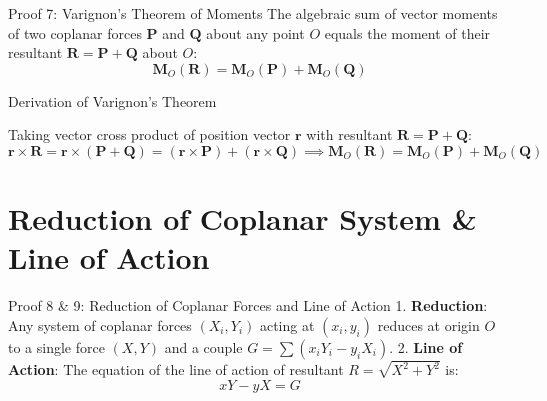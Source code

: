 \documentclass[11pt, a4paper]{report}
\begin{document}
\begin{theorembox}{Proof 7: Varignon's Theorem of Moments}
The algebraic sum of vector moments of two coplanar forces $\mathbf{P}$ and $\mathbf{Q}$ about any point $O$ equals the moment of their resultant $\mathbf{R} = \mathbf{P} + \mathbf{Q}$ about $O$:
\begin{equation}
\mathbf{M}_O(\mathbf{R}) = \mathbf{M}_O(\mathbf{P}) + \mathbf{M}_O(\mathbf{Q})
\end{equation}
\end{theorembox}

\begin{proofbox}{Derivation of Varignon's Theorem}
\begin{center}
\end{center}

Taking vector cross product of position vector $\mathbf{r}$ with resultant $\mathbf{R} = \mathbf{P} + \mathbf{Q}$:
\[
\mathbf{r} \times \mathbf{R} = \mathbf{r} \times (\mathbf{P} + \mathbf{Q}) = (\mathbf{r} \times \mathbf{P}) + (\mathbf{r} \times \mathbf{Q}) \implies \mathbf{M}_O(\mathbf{R}) = \mathbf{M}_O(\mathbf{P}) + \mathbf{M}_O(\mathbf{Q})
\]
\end{proofbox}

\section{Reduction of Coplanar System \& Line of Action}

\begin{theorembox}{Proof 8 \& 9: Reduction of Coplanar Forces and Line of Action}
1. \textbf{Reduction}: Any system of coplanar forces $(X_i, Y_i)$ acting at $(x_i, y_i)$ reduces at origin $O$ to a single force $(X, Y)$ and a couple $G = \sum (x_i Y_i - y_i X_i)$.
2. \textbf{Line of Action}: The equation of the line of action of resultant $R = \sqrt{X^2 + Y^2}$ is:
\begin{equation}
xY - yX = G
\end{equation}
\end{theorembox}
\end{document}
